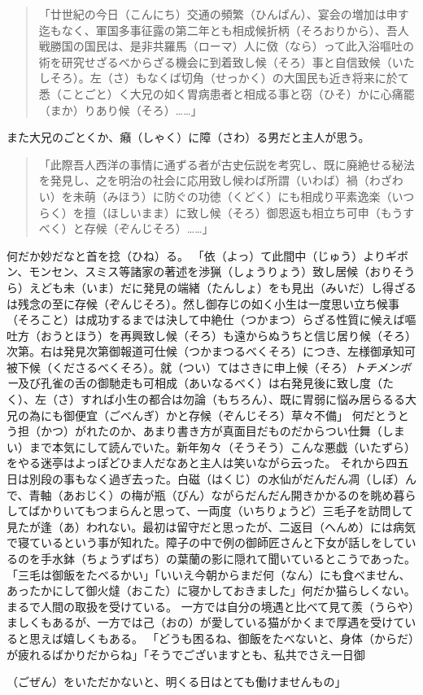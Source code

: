 \documentclass{book}
\begin{document}
\blockquote{「廿世紀の今日（こんにち）交通の頻繁（ひんぱん）、宴会の増加は申す迄もなく、軍国多事征露の第二年とも相成候折柄（そろおりから）、吾人戦勝国の国民は、是非共羅馬（ローマ）人に傚（なら）って此入浴嘔吐の術を研究せざるべからざる機会に到着致し候（そろ）事と自信致候（いたしそろ）。左（さ）もなくば切角（せっかく）の大国民も近き将来に於て悉（ことごと）く大兄の如く胃病患者と相成る事と窃（ひそ）かに心痛罷（まか）りあり候（そろ）\ldots{}\ldots{}」}
また大兄のごとくか、癪（しゃく）に障（さわ）る男だと主人が思う。
\blockquote{「此際吾人西洋の事情に通ずる者が古史伝説を考究し、既に廃絶せる秘法を発見し、之を明治の社会に応用致し候わば所謂（いわば）禍（わざわい）を未萌（みほう）に防ぐの功徳（くどく）にも相成り平素逸楽（いつらく）を擅（ほしいまま）に致し候（そろ）御恩返も相立ち可申（もうすべく）と存候（ぞんじそろ）\ldots{}\ldots{}」}
何だか妙だなと首を捻（ひね）る。
「依（よっ）て此間中（じゅう）よりギボン、モンセン、スミス等諸家の著述を渉猟（しょうりょう）致し居候（おりそうら）えども未（いま）だに発見の端緒（たんしょ）をも見出（みいだ）し得ざるは残念の至に存候（ぞんじそろ）。然し御存じの如く小生は一度思い立ち候事（そろこと）は成功するまでは決して中絶仕（つかまつ）らざる性質に候えば嘔吐方（おうとほう）を再興致し候（そろ）も遠からぬうちと信じ居り候（そろ）次第。右は発見次第御報道可仕候（つかまつるべくそろ）につき、左様御承知可被下候（くださるべくそろ）。就（つい）てはさきに申上候（そろ）\emph{トチメンボー}及び孔雀の舌の御馳走も可相成（あいなるべく）は右発見後に致し度（たく）、左（さ）すれば小生の都合は勿論（もちろん）、既に胃弱に悩み居らるる大兄の為にも御便宜（ごべんぎ）かと存候（ぞんじそろ）草々不備」
何だとうとう担（かつ）がれたのか、あまり書き方が真面目だものだからつい仕舞（しまい）まで本気にして読んでいた。新年匆々（そうそう）こんな悪戯（いたずら）をやる迷亭はよっぽどひま人だなあと主人は笑いながら云った。
それから四五日は別段の事もなく過ぎ去った。白磁（はくじ）の水仙がだんだん凋（しぼ）んで、青軸（あおじく）の梅が瓶（びん）ながらだんだん開きかかるのを眺め暮らしてばかりいてもつまらんと思って、一両度（いちりょうど）三毛子を訪問して見たが逢（あ）われない。最初は留守だと思ったが、二返目（へんめ）には病気で寝ているという事が知れた。障子の中で例の御師匠さんと下女が話しをしているのを手水鉢（ちょうずばち）の葉蘭の影に隠れて聞いているとこうであった。
「三毛は御飯をたべるかい」「いいえ今朝からまだ何（なん）にも食べません、あったかにして御火燵（おこた）に寝かしておきました」何だか猫らしくない。まるで人間の取扱を受けている。
一方では自分の境遇と比べて見て羨（うらや）ましくもあるが、一方では己（おの）が愛している猫がかくまで厚遇を受けていると思えば嬉しくもある。
「どうも困るね、御飯をたべないと、身体（からだ）が疲れるばかりだからね」「そうでございますとも、私共でさえ一日御\begin{comment}\texttt{[image: ../../../gaiji/2-92/2-92-71.png]}\end{comment}（ごぜん）をいただかないと、明くる日はとても働けませんもの」
\end{document}
